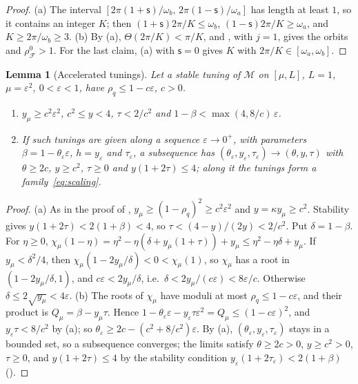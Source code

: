 \documentclass[11pt]{article}
\newtheorem{lemma}[theorem]{Lemma}
\theoremstyle{definition}
\theoremstyle{remark}
\newcommand{\cF}{\mathcal F}
\newcommand{\cM}{\mathcal M}
\newcommand{\rhoz}{\rho_{\cF}^{0}}
\begin{document}
\begin{proof}
(a) The interval \([2\pi(1+\mathsf s)/\omega_b,\,2\pi(1-\mathsf s)/\omega_a]\) has length at least \(1\), so it contains an integer \(K\); then
\((1+\mathsf s)2\pi/K\le\omega_b\), \((1-\mathsf s)2\pi/K\ge\omega_a\), and \(K\ge2\pi/\omega_b\ge3\).
(b) By (a), \(\Theta(2\pi/K)<\pi/K\), and , with \(j=1\), gives the orbits and \(\rhoz>1\).  For the
last claim, (a) with \(\mathsf s=0\) gives \(K\) with \(2\pi/K\in[\omega_a,\omega_b]\).
\end{proof}

\begin{lemma}[Accelerated tunings]\label{lem:accel}
Let a stable tuning of \(\cM\) on \([\mu,L]\), \(L=1\), \(\mu=\varepsilon^2\), \(0<\varepsilon<1\), have
\(\rho_q\le1-c\varepsilon\), \(c>0\).
\begin{enumerate}[label=\textup{(\alph*)}]
\item \(y_\mu\ge c^2\varepsilon^2\), \(c^2\le y<4\), \(\tau<2/c^2\) and \(1-\beta<\max(4,8/c)\,\varepsilon\).
\item If such tunings are given along a sequence \(\varepsilon\to0^+\), with
parameters \(\beta=1-\theta_\varepsilon\varepsilon\), \(h=y_\varepsilon\) and \(\tau_\varepsilon\), a subsequence has \((\theta_\varepsilon,y_\varepsilon,\tau_\varepsilon)\to(\theta,y,\tau)\) with \(\theta\ge2c\),
\(y\ge c^2\), \(\tau\ge0\) and \(y(1+2\tau)\le4\); along it the tunings form a family~\eqref{eq:scaling}.
\end{enumerate}
\end{lemma}

\begin{proof}
(a) As in the proof of , \(y_\mu\ge(1-\rho_q)^2\ge c^2\varepsilon^2\) and \(y=\kappa y_\mu\ge c^2\).
Stability gives \(y(1+2\tau)<2(1+\beta)<4\), so \(\tau<(4-y)/(2y)<2/c^2\).  Put
\(\delta=1-\beta\).  For \(\eta\ge0\),
\(\chi_\mu(1-\eta)=\eta^2-\eta(\delta+y_\mu(1+\tau))+y_\mu\le\eta^2-\eta\delta+y_\mu\).  If
\(y_\mu<\delta^2/4\), then \(\chi_\mu(1-2y_\mu/\delta)<0<\chi_\mu(1)\), so \(\chi_\mu\) has a root
in \((1-2y_\mu/\delta,1)\), and \(c\varepsilon<2y_\mu/\delta\), i.e.\
\(\delta<2y_\mu/(c\varepsilon)<8\varepsilon/c\).  Otherwise \(\delta\le2\sqrt{y_\mu}<4\varepsilon\).
(b) The roots of \(\chi_\mu\) have moduli at most \(\rho_q\le1-c\varepsilon\), and their product is \(Q_\mu=\beta-y_\mu\tau\).  Hence
\(1-\theta_\varepsilon\varepsilon-y_\varepsilon\tau\varepsilon^2=Q_\mu\le(1-c\varepsilon)^2\), and \(y_\varepsilon\tau<8/c^2\) by (a); so \(\theta_\varepsilon\ge2c-(c^2+8/c^2)\varepsilon\).  By (a),
\((\theta_\varepsilon,y_\varepsilon,\tau_\varepsilon)\) stays in a bounded set, so a subsequence converges; the limits satisfy \(\theta\ge2c>0\), \(y\ge c^2>0\), \(\tau\ge0\),
and \(y(1+2\tau)\le4\) by the stability condition \(y_\varepsilon(1+2\tau_\varepsilon)<2(1+\beta)\) (\Cref{lem:qstab}).
\end{proof}
\end{document}
